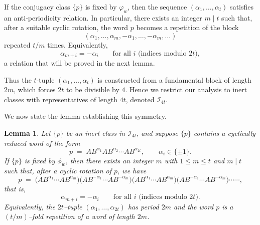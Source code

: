 \documentclass[a4paper,12pt]{amsart}
\numberwithin{equation}{section}
\newtheorem{lemma}[theorem]{Lemma}
\theoremstyle{definition}
\numberwithin{equation}{section}
\begin{document}
If the conjugacy class \(\{p\}\) is fixed by \(\varphi_w\), then the sequence \((\alpha_1,\ldots,\alpha_{t})\) satisfies an anti-periodicity relation. In particular, there exists an integer \(m\mid t\) such that, after a suitable cyclic rotation, the word \(p\) becomes a repetition of the block
\[
(\alpha_1,\ldots,\alpha_m,-\alpha_1,\ldots,-\alpha_m,\dots)
\]
repeated \(t/m\) times.  Equivalently,
\[
\alpha_{m+i}=-\alpha_i \qquad \text{for all $i$ (indices modulo $2t$)},
\]
a relation that will be proved in the next lemma.

Thus the \(t\)-tuple \((\alpha_1,\ldots,\alpha_{t})\) is constructed from a fundamental
block of length \(2m\), which forces \(2t\) to be divisible by \(4\).  Hence we restrict our
analysis to inert classes with representatives of length \(4t\), denoted \(\mathscr{I}_{4t}\).

We now state the lemma establishing this symmetry.
\begin{lemma}\label{2.1}
Let $\{p\}$ be an inert class in $\mathscr{I}_{4t}$, and suppose
$\{p\}$ contains a cyclically reduced word of the form
\[
p \;=\; AB^{\alpha_1}AB^{\alpha_2}\cdots AB^{\alpha_{2t}}, 
\qquad \alpha_i \in \{\pm 1\}.
\]
If $\{p\}$ is fixed by $\phi_w$, then there exists an integer $m$ with 
$1 \le m \le t$ and $m \mid t$ such that, after a cyclic rotation of $p$, we have
\[
p \;=\;
\big(AB^{\alpha_1}\cdots AB^{\alpha_m}\big)
\big(AB^{-\alpha_1}\cdots AB^{-\alpha_m}\big)
\big(AB^{\alpha_1}\cdots AB^{\alpha_m}\big)
\big(AB^{-\alpha_1}\cdots AB^{-\alpha_m}\big)\cdots\cdots,
\]
that is,
\[
\alpha_{m+i} = -\alpha_i \qquad \text{for all $i$ (indices modulo $2t$)}.
\]
Equivalently, the $2t$--tuple $(\alpha_1,\dots,\alpha_{2t})$ has period $2m$
and the word $p$ is a $(t/m)$--fold repetition of a word of length $2m$.
\end{lemma}
\end{document}
